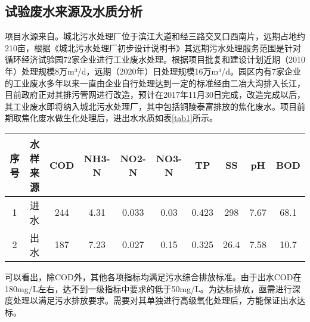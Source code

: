 \subsection{试验废水来源及水质分析}
项目水源来自。城北污水处理厂位于滨江大道和经三路交叉口西南片，远期占地约210亩，根据《城北污水处理厂初步设计说明书》其远期污水处理服务范围是针对循环经济试验园72家企业进行工业废水处理。根据项目批复和建设计划近期（2010年）处理规模8万m³/d，远期（2020年）日处理规模16万m³/d。园区内有7家企业的工业废水多年以来一直由企业自行处理达到一定的标准经由二冶大沟排入长江，
目前政府正对其排污管网进行改造，预计在2017年11月30日完成，改造完成以后，其工业废水即将纳入城北污水处理厂，其中包括铜陵泰富排放的焦化废水。项目前期取焦化废水做生化处理后，进出水水质如表\ref{tab1}所示。\par
\begin{center}
\label{tab1}
\begin{tabular}{| c | c | c | c | c | c | c | c | c | c |}
    \hline
    序号 & 水样来源 & COD & NH3-N & NO2-N & NO3-N & TP & SS & pH & BOD\\ \hline 
    1 & 进水 & 244 & 4.31 & 0.033 & 0.03 & 0.423 & 298 & 7.67 & 68.1\\ \hline 
    2 & 出水 & 187 & 7.23 & 0.027 & 0.15 & 0.325 & 26.4 & 7.58 & 10.7\\ \hline 
\end{tabular}
\end{center}
\setlength{\parindent}{2em}
\par
可以看出，除COD外，其他各项指标均满足污水综合排放标准。由于出水\linebreak COD在180mg/L左右，达不到一级指标中要求的低于50mg/L。为达标排放，亟需进行深度处理以满足污水排放要求。需要对其单独进行高级氧化处理后，方能保证出水达标。\par

